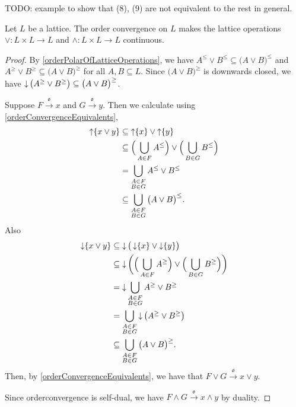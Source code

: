 \begin{example}
TODO: example to show that (8), (9) are not equivalent to the rest in general.
\end{example}

\begin{proposition}
Let $L$ be a lattice. The order convergence on $L$ makes the lattice operations $\vee: L\times L\to L$ and $\wedge: L\times L\to L$ continuous.
\end{proposition}
\begin{proof}
By \ref{orderPolarOfLatticeOperations}, we have $A^\leq \vee B^\leq \subseteq \big(A\vee B\big)^\leq$ and $A^\geq \vee B^\geq \subseteq \big(A\vee B\big)^\geq$ for all $A,B\subseteq L$. Since $\big(A\vee B\big)^\geq$ is downwards closed, we have $\operatorname{\downarrow}\big(A^\geq \vee B^\geq\big) \subseteq \big(A\vee B\big)^\geq$.

Suppose $F\overset{\mathfrak{o}}{\longrightarrow} x$ and $G\overset{\mathfrak{o}}{\longrightarrow} y$. Then we calculate using \ref{orderConvergenceEquivalents},
\begin{align*}
\operatorname{\uparrow}\{x\vee y\} &\subseteq \operatorname{\uparrow}\{x\} \vee \operatorname{\uparrow}\{y\} \\
&\subseteq \Big(\bigcup_{A\in F} A^\leq\Big)\vee \Big(\bigcup_{B\in G} B^\leq\Big) \\
&= \bigcup_{\substack{A\in F \\ B\in G}} A^\leq \vee B^\leq \\
&\subseteq \bigcup_{\substack{A\in F \\ B\in G}} \big(A \vee B\big)^\leq.
\end{align*}
Also
\begin{align*}
\operatorname{\downarrow}\{x\vee y\} &\subseteq \operatorname{\downarrow}\big(\operatorname{\downarrow}\{x\} \vee \operatorname{\downarrow}\{y\}\big) \\
&\subseteq \operatorname{\downarrow}\bigg(\Big(\bigcup_{A\in F} A^\geq\Big)\vee \Big(\bigcup_{B\in G} B^\geq\Big)\bigg) \\
&= \operatorname{\downarrow}\bigcup_{\substack{A\in F \\ B\in G}} A^\geq \vee B^\geq \\
&= \bigcup_{\substack{A\in F \\ B\in G}} \operatorname{\downarrow}\big(A^\geq \vee B^\geq\big) \\
&\subseteq \bigcup_{\substack{A\in F \\ B\in G}} \big(A \vee B\big)^\geq.
\end{align*}
Then, by \ref{orderConvergenceEquivalents}, we have that $F\vee G \overset{\mathfrak{o}}{\longrightarrow} x\vee y$.

Since orderconvergence is self-dual, we have $F\wedge G \overset{\mathfrak{o}}{\longrightarrow} x\wedge y$ by duality.
\end{proof}

